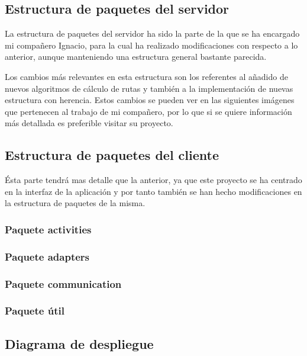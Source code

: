 \subsection{Estructura de paquetes del servidor}

La estructura de paquetes del servidor ha sido la parte de la que se ha encargado mi compañero Ignacio, para la cual ha realizado modificaciones con respecto a lo anterior, aunque manteniendo una estructura general bastante parecida. 

Los cambios más relevantes en esta estructura son los referentes al añadido de nuevos algoritmos de cálculo de rutas y también a la implementación de nuevas estructura con herencia. Estos cambios se pueden ver en las siguientes imágenes que pertenecen al trabajo de mi compañero, por lo que si se quiere información más detallada es preferible visitar su proyecto.

\subsection{Estructura de paquetes del cliente}

Ésta parte tendrá mas detalle que la anterior, ya que este proyecto se ha centrado en la interfaz de la aplicación y por tanto también se han hecho modificaciones en la estructura de paquetes de la misma.

\subsubsection{Paquete activities}

\subsubsection{Paquete adapters}

\subsubsection{Paquete communication}

\subsubsection{Paquete útil}

\subsection{Diagrama de despliegue}

